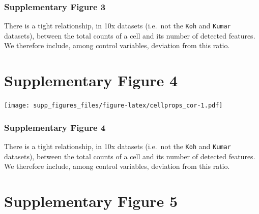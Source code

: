 \documentclass[]{article}
\begin{document}
\hypertarget{supplementary-figure-3-1}{%
\subsubsection{Supplementary Figure 3}\label{supplementary-figure-3-1}}

There is a tight relationship, in 10x datasets (i.e.~not the
\texttt{Koh} and \texttt{Kumar} datasets), between the total counts of a
cell and its number of detected features. We therefore include, among
control variables, deviation from this ratio.

\newpage

\hypertarget{supplementary-figure-4}{%
\section{Supplementary Figure 4}\label{supplementary-figure-4}}

\texttt{[image: supp\_figures\_files/figure-latex/cellprops\_cor-1.pdf]}

\hypertarget{supplementary-figure-4-1}{%
\subsubsection{Supplementary Figure 4}\label{supplementary-figure-4-1}}

There is a tight relationship, in 10x datasets (i.e.~not the
\texttt{Koh} and \texttt{Kumar} datasets), between the total counts of a
cell and its number of detected features. We therefore include, among
control variables, deviation from this ratio.

\newpage

\hypertarget{supplementary-figure-5}{%
\section{Supplementary Figure 5}\label{supplementary-figure-5}}
\end{document}
